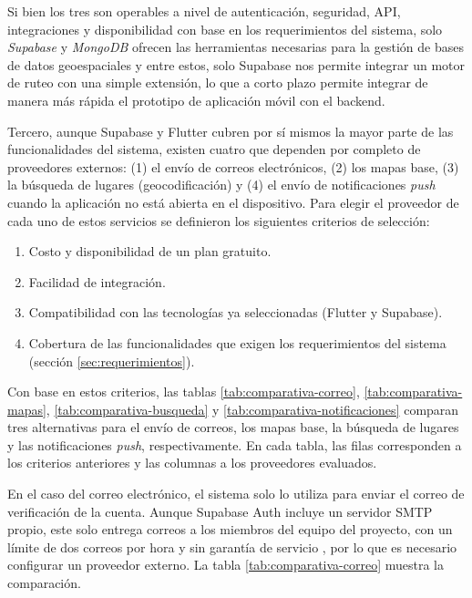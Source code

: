 Si bien los tres son operables a nivel de autenticación, seguridad, API, integraciones y disponibilidad con base en los requerimientos del sistema, solo \textit{Supabase} y \textit{MongoDB} ofrecen las herramientas necesarias para la gestión de bases de datos geoespaciales y entre estos, solo Supabase nos permite integrar un motor de ruteo con una simple extensión, lo que a corto plazo permite integrar de manera más rápida el prototipo de aplicación móvil con el backend.

Tercero, aunque Supabase y Flutter cubren por sí mismos la mayor parte de las funcionalidades del sistema, existen cuatro que dependen por completo de proveedores externos: (1) el envío de correos electrónicos, (2) los mapas base, (3) la búsqueda de lugares (geocodificación) y (4) el envío de notificaciones \textit{push} cuando la aplicación no está abierta en el dispositivo. Para elegir el proveedor de cada uno de estos servicios se definieron los siguientes criterios de selección:
\begin{enumerate}
    \item Costo y disponibilidad de un plan gratuito.
    \item Facilidad de integración.
    \item Compatibilidad con las tecnologías ya seleccionadas (Flutter y Supabase).
    \item Cobertura de las funcionalidades que exigen los requerimientos del sistema (sección \ref{sec:requerimientos}).
\end{enumerate}

Con base en estos criterios, las tablas \ref{tab:comparativa-correo}, \ref{tab:comparativa-mapas}, \ref{tab:comparativa-busqueda} y \ref{tab:comparativa-notificaciones} comparan tres alternativas para el envío de correos, los mapas base, la búsqueda de lugares y las notificaciones \textit{push}, respectivamente. En cada tabla, las filas corresponden a los criterios anteriores y las columnas a los proveedores evaluados.


En el caso del correo electrónico, el sistema solo lo utiliza para enviar el correo de verificación de la cuenta. Aunque Supabase Auth incluye un servidor SMTP propio, este solo entrega correos a los miembros del equipo del proyecto, con un límite de dos correos por hora y sin garantía de servicio \cite{supabase_smtp}, por lo que es necesario configurar un proveedor externo. La tabla \ref{tab:comparativa-correo} muestra la comparación.


